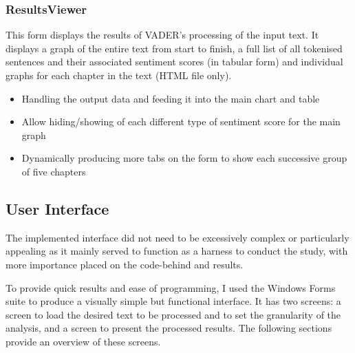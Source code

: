 \documentclass{article}
\begin{document}
        \subsubsection{ResultsViewer}
            This form displays the results of VADER's processing of the input text. It displays a graph of the entire text from start to finish, a full list of all tokenised sentences and their associated sentiment scores (in tabular form) and individual graphs for each chapter in the text (HTML file only).

            \begin{itemize}
                \item Handling the output data and feeding it into the main chart and table
                \item Allow hiding/showing of each different type of sentiment score for the main graph
                \item Dynamically producing more tabs on the form to show each successive group of five chapters
            \end{itemize}
    \subsection{User Interface}
        The implemented interface did not need to be excessively complex or particularly appealing as it mainly served to function as a harness to conduct the study, with more importance placed on the code-behind and results.

        To provide quick results and ease of programming, I used the Windows Forms suite to produce a visually simple but functional interface. It has two screens: a screen to load the desired text to be processed and to set the granularity of the analysis, and a screen to present the processed results. The following sections provide an overview of these screens.
\end{document}
